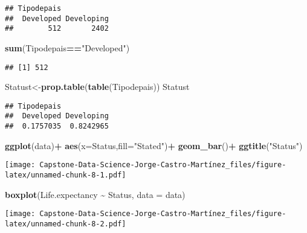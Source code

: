 \documentclass[
]{article}
\newenvironment{Shaded}{\begin{snugshade}}{\end{snugshade}}
\newcommand{\AttributeTok}[1]{\textcolor[rgb]{0.13,0.29,0.53}{#1}}
\newcommand{\FunctionTok}[1]{\textcolor[rgb]{0.13,0.29,0.53}{\textbf{#1}}}
\newcommand{\NormalTok}[1]{#1}
\newcommand{\OtherTok}[1]{\textcolor[rgb]{0.56,0.35,0.01}{#1}}
\newcommand{\SpecialCharTok}[1]{\textcolor[rgb]{0.81,0.36,0.00}{\textbf{#1}}}
\newcommand{\StringTok}[1]{\textcolor[rgb]{0.31,0.60,0.02}{#1}}
\begin{document}
\begin{verbatim}
## Tipodepais
##  Developed Developing 
##        512       2402
\end{verbatim}

\begin{Shaded}
\begin{Highlighting}[]
\FunctionTok{sum}\NormalTok{(Tipodepais}\SpecialCharTok{==}\StringTok{"Developed"}\NormalTok{)}
\end{Highlighting}
\end{Shaded}

\begin{verbatim}
## [1] 512
\end{verbatim}

\begin{Shaded}
\begin{Highlighting}[]
\NormalTok{Statust}\OtherTok{\textless{}{-}}\FunctionTok{prop.table}\NormalTok{(}\FunctionTok{table}\NormalTok{(Tipodepais))}
\NormalTok{Statust}
\end{Highlighting}
\end{Shaded}

\begin{verbatim}
## Tipodepais
##  Developed Developing 
##  0.1757035  0.8242965
\end{verbatim}

\begin{Shaded}
\begin{Highlighting}[]
\FunctionTok{ggplot}\NormalTok{(data)}\SpecialCharTok{+}
  \FunctionTok{aes}\NormalTok{(}\AttributeTok{x=}\NormalTok{Status,}\AttributeTok{fill=}\StringTok{"Stated"}\NormalTok{)}\SpecialCharTok{+}
  \FunctionTok{geom\_bar}\NormalTok{()}\SpecialCharTok{+}
  \FunctionTok{ggtitle}\NormalTok{(}\StringTok{"Status"}\NormalTok{)}
\end{Highlighting}
\end{Shaded}

\texttt{[image: Capstone-Data-Science-Jorge-Castro-Martínez\_files/figure-latex/unnamed-chunk-8-1.pdf]}

\begin{Shaded}
\begin{Highlighting}[]
\FunctionTok{boxplot}\NormalTok{(Life.expectancy }\SpecialCharTok{\textasciitilde{}}\NormalTok{ Status, }\AttributeTok{data =}\NormalTok{ data)}
\end{Highlighting}
\end{Shaded}

\texttt{[image: Capstone-Data-Science-Jorge-Castro-Martínez\_files/figure-latex/unnamed-chunk-8-2.pdf]}
\end{document}
